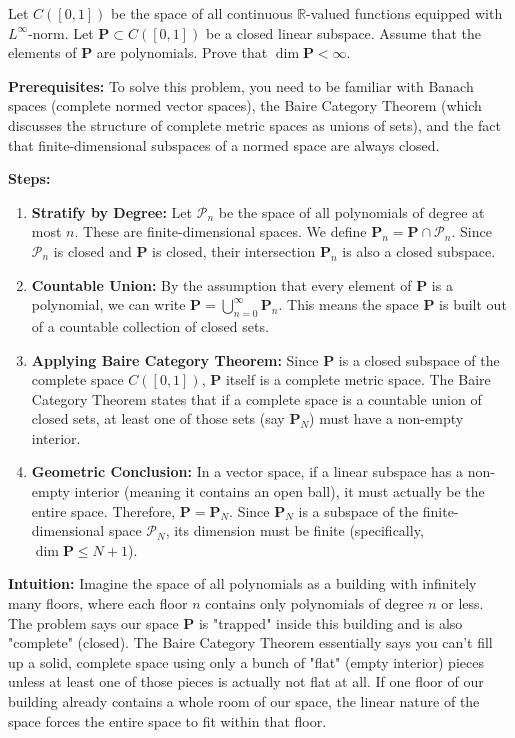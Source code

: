 \begin{exercise}
\label{analysis:2022:4}
Let $C([0,1])$ be the space of all continuous $\mathbb{R}$-valued functions equipped with $L^{\infty}$-norm. Let $\mathbf{P}\subset C([0,1])$ be a closed linear subspace. Assume that the elements of $\mathbf{P}$ are polynomials. Prove that $\dim\mathbf{P}<\infty$.
\end{exercise}

\begin{solution}
\textbf{Prerequisites:}
To solve this problem, you need to be familiar with Banach spaces (complete normed vector spaces), the Baire Category Theorem (which discusses the structure of complete metric spaces as unions of sets), and the fact that finite-dimensional subspaces of a normed space are always closed.


\textbf{Steps:}
\begin{enumerate}
    \item \textbf{Stratify by Degree:} Let $\mathcal{P}_n$ be the space of all polynomials of degree at most $n$. These are finite-dimensional spaces. We define $\mathbf{P}_n = \mathbf{P} \cap \mathcal{P}_n$. Since $\mathcal{P}_n$ is closed and $\mathbf{P}$ is closed, their intersection $\mathbf{P}_n$ is also a closed subspace.

    \item \textbf{Countable Union:} By the assumption that every element of $\mathbf{P}$ is a polynomial, we can write $\mathbf{P} = \bigcup_{n=0}^\infty \mathbf{P}_n$. This means the space $\mathbf{P}$ is built out of a countable collection of closed sets.

    \item \textbf{Applying Baire Category Theorem:} Since $\mathbf{P}$ is a closed subspace of the complete space $C([0,1])$, $\mathbf{P}$ itself is a complete metric space. The Baire Category Theorem states that if a complete space is a countable union of closed sets, at least one of those sets (say $\mathbf{P}_N$) must have a non-empty interior.

    \item \textbf{Geometric Conclusion:} In a vector space, if a linear subspace has a non-empty interior (meaning it contains an open ball), it must actually be the entire space. Therefore, $\mathbf{P} = \mathbf{P}_N$. Since $\mathbf{P}_N$ is a subspace of the finite-dimensional space $\mathcal{P}_N$, its dimension must be finite (specifically, $\dim \mathbf{P} \leq N+1$).
\end{enumerate}


\textbf{Intuition:}
Imagine the space of all polynomials as a building with infinitely many floors, where each floor $n$ contains only polynomials of degree $n$ or less. The problem says our space $\mathbf{P}$ is "trapped" inside this building and is also "complete" (closed). The Baire Category Theorem essentially says you can't fill up a solid, complete space using only a bunch of "flat" (empty interior) pieces unless at least one of those pieces is actually not flat at all. If one floor of our building already contains a whole room of our space, the linear nature of the space forces the entire space to fit within that floor.
\end{solution}

